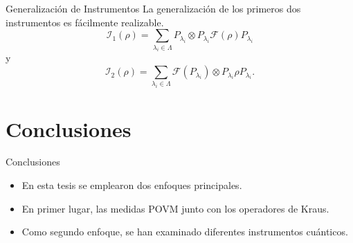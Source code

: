 \documentclass[svgnames,12pt,aspectratio=149]{beamer}
\newcommand{\tensor}{\otimes}
\newcommand{\fuzzy}[1]{\mathcal{F}\left(#1\right)}
\begin{document}
\begin{frame}{Generalización de Instrumentos}
  La generalización de los primeros dos instrumentos es fácilmente realizable.
\begin{equation*}
    \mathcal{I}_1(\rho)=\sum_{\lambda_i \in \Lambda }P_{\lambda_i}\otimes P_{\lambda_i}\fuzzy{\rho}P_{\lambda_i}
\end{equation*} 
y
\begin{equation*}
  \mathcal{I}_2(\rho)= \sum_{\lambda_i \in \Lambda } \fuzzy{P_{\lambda_i}}\tensor P_{\lambda_i}\rho P_{\lambda_i}.
\end{equation*} 





\end{frame}




\section{Conclusiones}

\begin{frame}{Conclusiones}
    \begin{itemize}
      \item En esta tesis se emplearon dos enfoques
      principales.
      
      
      \item En primer lugar, las medidas POVM junto con los operadores de Kraus. 
      
      \item Como segundo enfoque, se han examinado diferentes instrumentos cuánticos. %
    \end{itemize}
\end{frame}
\end{document}

